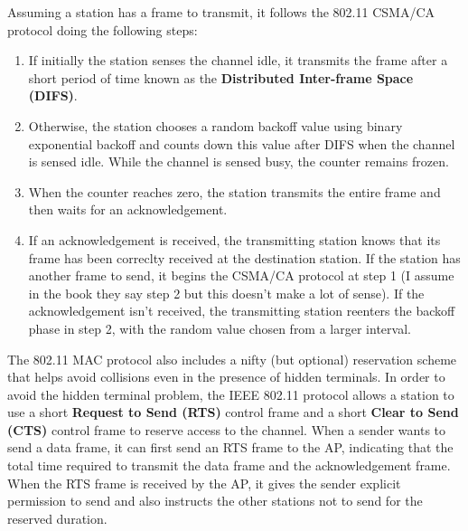 Assuming a station has a frame to transmit, it follows the 802.11 CSMA/CA protocol doing the following steps:
\begin{enumerate}
\item If initially the station senses the channel idle, it transmits the frame after a short period of time known as the \textbf{Distributed Inter-frame Space (DIFS)}.
\item Otherwise, the station chooses a random backoff value using binary exponential backoff and counts down this value after DIFS when the channel is sensed idle. While the channel is sensed busy, the counter remains frozen.
\item When the counter reaches zero, the station transmits the entire frame and then waits for an acknowledgement.
\item If an acknowledgement is received, the transmitting station knows that its frame has been correclty received at the destination station. If the station has another frame to send, it begins the CSMA/CA protocol at step 1 (I assume in the book they say step 2 but this doesn't make a lot of sense). If the acknowledgement isn't received, the transmitting station reenters the backoff phase in step 2, with the random value chosen from a larger interval.
\end{enumerate}
The 802.11 MAC protocol also includes a nifty (but optional) reservation scheme that helps avoid collisions even in the presence of hidden terminals. In order to avoid the hidden terminal problem, the IEEE 802.11 protocol allows a station to use a short \textbf{Request to Send (RTS)} control frame and a short \textbf{Clear to Send (CTS)} control frame to reserve access to the channel. When a sender wants to send a data frame, it can first send an RTS frame to the AP, indicating that the total time required to transmit the data frame and the acknowledgement frame. When the RTS frame is received by the AP, it gives the sender explicit permission to send and also instructs the other stations not to send for the reserved duration.

